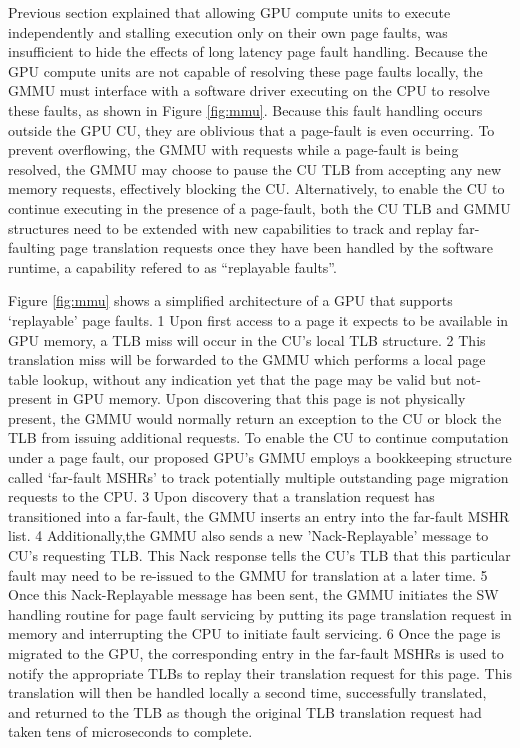 Previous section explained that allowing GPU compute units to execute independently and stalling execution only on their own page faults, was insufficient to hide the effects of long latency page fault handling. Because the GPU compute units are not capable of resolving these page faults locally, the GMMU must interface with a software driver executing on the CPU to resolve these faults, as shown in Figure \ref{fig:mmu}. Because this fault handling occurs outside the GPU CU, they are oblivious that a page-fault is even occurring. To prevent overflowing, the GMMU with requests while a page-fault is being resolved, the GMMU may choose to pause the CU TLB from accepting any new memory requests, effectively blocking the CU. Alternatively, to enable the CU to continue executing in the presence of a page-fault, both the CU TLB and GMMU structures need to be extended with new capabilities to track and replay far-faulting page translation requests once they have been handled by the software runtime, a capability refered to as “replayable faults”. 

Figure \ref{fig:mmu} shows a simplified architecture of a GPU that supports ‘replayable’ page faults. \textcircled{\small{1}} Upon first access to a page it expects to be available in GPU memory, a TLB miss will occur in the CU’s local TLB structure. \textcircled{\small{2}} This translation miss will be forwarded to the GMMU which performs a local page table lookup, without any indication yet that the page may be valid but not-present in GPU memory. Upon discovering that this page is not physically present, the GMMU would normally return an exception to the CU or block the TLB from issuing additional requests. To enable the CU to continue computation under a page fault, our proposed GPU’s GMMU employs a bookkeeping structure called ‘far-fault MSHRs’ to track potentially multiple outstanding page migration requests to the CPU. \textcircled{\small{3}} Upon discovery that a translation request has transitioned into a far-fault, the GMMU inserts an entry into the far-fault MSHR list. \textcircled{\small{4}} Additionally,the GMMU also sends a new ’Nack-Replayable’ message to CU’s requesting TLB. This Nack response tells the CU’s TLB that this particular fault may need to be re-issued to the GMMU for translation at a later time. \textcircled{\small{5}} Once this Nack-Replayable message has been sent, the GMMU initiates the SW handling routine for page fault servicing by putting its page translation request in memory and interrupting the CPU to initiate fault servicing. \textcircled{\small{6}} Once the page is migrated to the GPU, the corresponding entry in the far-fault MSHRs is used to notify the appropriate TLBs to replay their translation request for this page. This translation will then be handled locally a second time, successfully translated, and returned to the TLB as though the original TLB translation request had taken tens of microseconds to complete.

